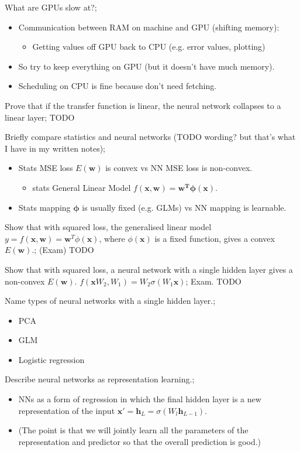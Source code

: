 \documentclass{article}
\begin{document}
What are GPUs slow at?; \begin{itemize}
    \item Communication between RAM on machine and GPU (shifting memory): \begin{itemize}
        \item Getting values off GPU back to CPU (e.g. error values, plotting)
    \end{itemize}
    \item So try to keep everything on GPU (but it doesn't have much memory). \item Scheduling on CPU is fine because don't need fetching.
\end{itemize}

Prove that if the transfer function is linear, the neural network collapses to a linear layer; TODO

Briefly compare statistics and neural networks (TODO wording? but that's what I have in my written notes); \begin{itemize}
    \item Stats MSE loss $E(\mathbf{w})$ is convex vs NN MSE loss is non-convex.
    \begin{itemize}
        \item stats General Linear Model $f(\mathbf{x, w})=\mathbf{w^T\phi(x)}$.
    \end{itemize}
    \item Stats mapping $\mathbf{\phi}$ is usually fixed (e.g. GLMs) vs NN mapping is learnable.
\end{itemize}

Show that with squared loss, the generalised linear model $y = f(\bm{x,w})=\bm{w}^T\phi(\bm{x})$, where $\phi(\bm{x})$ is a fixed function, gives a convex $E(\bm{w})$.; (Exam) TODO

Show that with squared loss, a neural network with a single hidden layer gives a non-convex $E(\bm{w})$. $f(\bm{x} W_2, W_1) = W_2\sigma(W_1 \bm{x})$; Exam. TODO

Name types of neural networks with a single hidden layer.; \begin{itemize}
    \item PCA
    \item GLM
    \item Logistic regression
\end{itemize}

Describe neural networks as representation learning.; \begin{itemize}
    \item NNs as a form of regression in which the final hidden layer is a new representation of the input $\bm{x'} = \bm{h}_L = \sigma(W_l\bm{h}_{L-1})$.
    \item (The point is that we will jointly learn all the parameters of the representation and predictor so that the overall prediction is good.)
\end{itemize}
\end{document}
